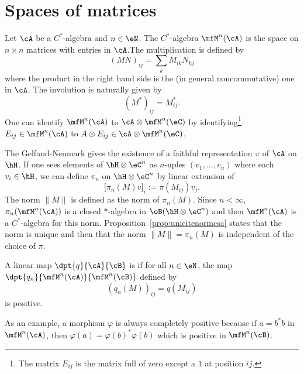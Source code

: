 %
   \section{Spaces of matrices}
%

Let $\cA$ be a $C^*$-algebra and $n\in\eN$. The $C^*$-algebra $\mfM^n(\cA)$ is the space on $n\times n$ matrices with entries in $\cA$.The multiplication is defined by
\begin{equation}
  (MN)_{ij}=\sum_kM_{ik}N_{kj}
\end{equation}
where the product in the right hand side is the (in general noncommutative) one in $\cA$. The involution is naturally given by
\begin{equation}
  (M^*)_{ij}=M_{ij}^*.
\end{equation}
One can identify $\mfM^n(\cA)$ to $\cA\otimes\mfM^n(\eC)$ by identifying\footnote{The matrix $E_{ij}$ is the matrix full of zero except a $1$ at position $ij$.} $E_{ij}\in\mfM^n(\cA)$ to $A\otimes E_{ij}\in\cA\otimes\mfM^n(\eC)$.

The Gelfand-Neumark gives the existence of a faithful representation $\pi$ of $\cA$ on $\hH$. If one sees elements of $\hH\otimes\eC^n$ as $n$-uples $(v_1,\ldots,v_n)$ where each $v_i\in\hH$, we can define $\pi_n$ on $\hH\otimes\eC^n$ by linear extension of
\begin{equation} \label{eq:defreprezmfM}
  \big[\pi_n(M)v\big]_i:=\pi(M_{ij})v_j.
\end{equation}
The norm $\| M \|$ is defined as the norm of $\pi_n(M)$. Since $n<\infty$, $\pi_n(\mfM^n(\cA))$ is a closed $*$-algebra in $\oB(\hH\otimes\eC^n)$ and then $\mfM^n(\cA)$ is a $C^*$-algebra for this norm. Proposition~\ref{prop:unicitenormcsa} states that the norm is unique and then that the norm $\| M \|=\pi_n(M)$ is independent of the choice of $\pi$.

\begin{definition}      \label{DefComplPositive}
    A linear map $\dpt{ q }{ \cA }{ \cB }$ is  if for all $n\in\eN$, the map $\dpt{ q_n }{ \mfM^n(\cA) }{ \mfM^n(\cB) }$ defined by
    \[
      (q_n(M))_{ij}=q(M_{ij})
    \]
    is positive.
\end{definition}
As an example, a morphism $\varphi$ is always completely positive because if $a=b^*b$ in $\mfM^n(\cA)$, then $\varphi(a)=\varphi(b)^*\varphi(b)$ which is positive in $\mfM^n(\cB)$.

